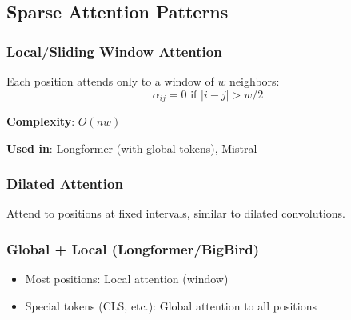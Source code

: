 \subsection{Sparse Attention Patterns}

\subsubsection{Local/Sliding Window Attention}

Each position attends only to a window of $w$ neighbors:
\begin{equation}
\alpha_{ij} = 0 \text{ if } |i - j| > w/2
\end{equation}

\textbf{Complexity}: $O(nw)$

\textbf{Used in}: Longformer (with global tokens), Mistral

\subsubsection{Dilated Attention}

Attend to positions at fixed intervals, similar to dilated convolutions.

\subsubsection{Global + Local (Longformer/BigBird)}

\begin{itemize}
    \item Most positions: Local attention (window)
    \item Special tokens (CLS, etc.): Global attention to all positions
\end{itemize}

